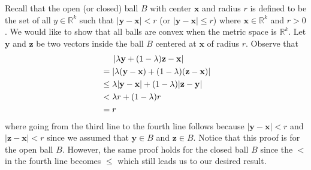 \documentclass[12pt]{article}
\begin{document}
Recall that the open (or closed) ball $B$ with center $\textbf{x}$ and radius $r$ is defined to be the set of all $y \in \mathbb{R}^{k}$ such that $|\textbf{y}-\textbf{x}|<r$ (or $|\textbf{y}-\textbf{x}| \leq r$) where $\textbf{x} \in \mathbb{R}^{k}$ and $r>0$. We would like to show that all balls are convex when the metric space is $\mathbb{R}^{k}$. Let $\textbf{y}$ and $\textbf{z}$ be two vectors inside the ball $B$ centered at $\textbf{x}$ of radius $r$. Observe that 
\begin{align*}
& \indent |\lambda\textbf{y} + (1-\lambda)\textbf{z}-\textbf{x}|\\
& = |\lambda(\textbf{y}-\textbf{x})+(1-\lambda)(\textbf{z}-\textbf{x})| \\ 
& \leq \lambda | \textbf{y}-\textbf{x}| + (1-\lambda)|\textbf{z}-\textbf{y}| \\
& < \lambda r + (1-\lambda)r \\
& = r
\end{align*}
where going from the third line to the fourth line follows because $|\textbf{y}-\textbf{x}|<r$ and $|\textbf{z}-\textbf{x}|<r$ since we assumed that $\textbf{y} \in B$ and $\textbf{z} \in B$.  Notice that this proof is for the open ball $B$. However, the same proof holds for the closed ball $B$ since the $<$ in the fourth line becomes $\leq$ which still leads us to our desired result. \\ \\ 
\end{document}
